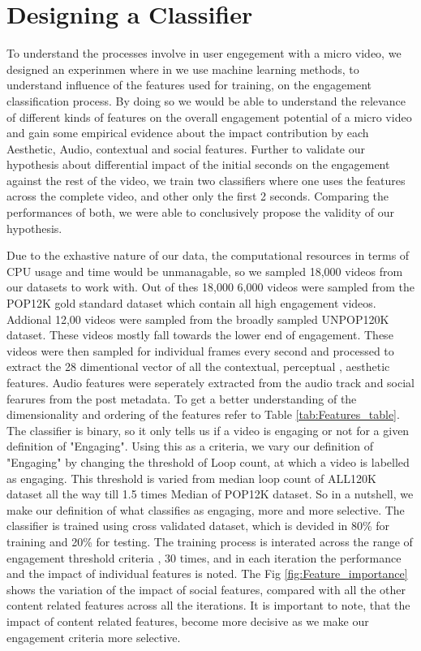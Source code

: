 \section{Designing a Classifier}
To understand the processes involve in user engegement with a micro video, we designed an experinmen where in we use machine learning methods,  to understand influence of the features used for training, on the engagement classification process. By doing so we would be able to understand the relevance of different kinds of features on the overall engagement potential of a micro video and gain some empirical evidence about the impact contribution by each Aesthetic, Audio, contextual and social features. Further to validate our hypothesis about differential impact of the initial seconds on the engagement against the rest of the video, we train two classifiers where one uses the features across the complete video, and other only the first 2 seconds. Comparing the performances of both, we were able to conclusively propose the validity of our hypothesis.  
\par
Due to the exhastive nature of our data, the computational resources in terms of CPU usage and time would be unmanagable, so we sampled 18,000 videos from our datasets to work with. Out of thes 18,000  6,000 videos were sampled from the POP12K gold standard dataset which contain all high engagement videos. Addional 12,00 videos were sampled from the broadly sampled UNPOP120K dataset. These videos mostly fall towards the lower end of engagement. These videos were then sampled for individual frames every second and processed to extract the 28 dimentional vector of all the contextual, perceptual , aesthetic features.  Audio features were seperately extracted from the audio track and social fearures from the post metadata. To get a better understanding of the dimensionality and ordering of the features refer to Table \ref{tab:Features_table}. The classifier is binary, so it only tells us if a video is engaging or not for a given definition of "Engaging". Using this as a criteria, we vary our definition of "Engaging" by changing the threshold of Loop count, at which a video is labelled as engaging. This threshold is varied from median loop count of ALL120K dataset all the way till 1.5 times Median of POP12K dataset. So in a nutshell, we make our definition of what classifies as engaging, more and more selective. The classifier is trained using cross validated dataset, which is devided in 80\% for training and 20\% for testing. The training process is interated across the range of engagement threshold criteria , 30 times, and in each iteration the performance and the impact of individual features is noted. The Fig \ref{fig:Feature_importance} shows the variation of the impact of social features, compared with all the other content related features across all the iterations. It is important to note, that the impact of content related features, become more decisive as we make our engagement criteria more selective. 


